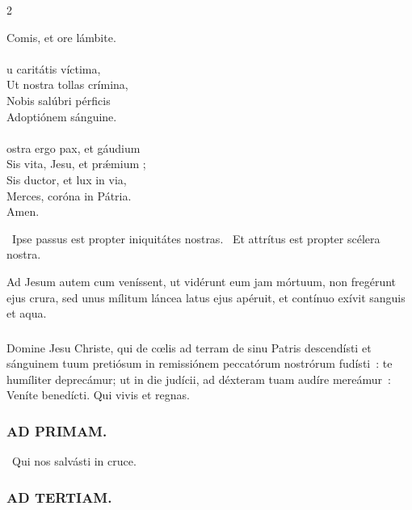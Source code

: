 \documentclass[9pt,twoside]{extarticle}
\begin{document}
\begin{multicols}{2}
{{Comis, et ore lámbite.\\
\\
u caritátis víctima,\\
Ut nostra tollas crímina,\\
Nobis salúbri pérficis\\
Adoptiónem sánguine.\\
\\
ostra ergo pax, et gáudium\\
Sis vita, Jesu, et prǽmium ;\\
Sis ductor, et lux in via,\\
Merces, coróna in Pátria.\\
Amen.

\begin{tightlist}{}
\item {}~Ipse passus est propter iniquitátes nostras. ~Et attrítus est propter scélera nostra.
\item {} Ad Jesum autem cum veníssent, ut vidérunt eum jam mórtuum, non fregérunt ejus crura, sed unus mílitum láncea latus ejus apéruit, et contínuo exívit sanguis et aqua.
\end{tightlist}

\subsubsection*{\center{}}
\lettrine{D}omine Jesu Christe, qui de cœlis ad terram de sinu Patris descendísti et sánguinem tuum pretiósum in remissiónem peccatórum nostrórum fudísti~: te humíliter deprecámur; ut in die judícii, ad déxteram tuam audíre mereámur~: Veníte benedícti. Qui vivis et regnas.

\begin{tightlist}{}
\item {}
\end{tightlist}

\subsubsection*{\center \textsc{AD PRIMAM.}}
\begin{tightlist}{}
\item {}~Qui nos salvásti in cruce.
\end{tightlist}

\subsubsection*{\center \textsc{AD TERTIAM.}}
}}
\end{multicols}
\end{document}
